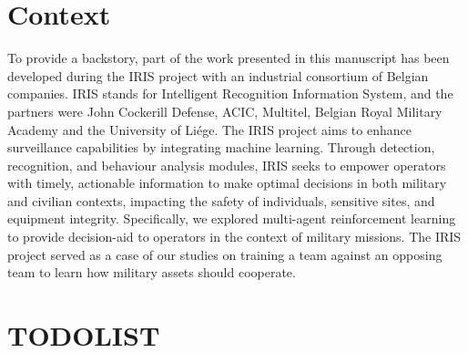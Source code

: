 \section{Context}
\label{sec:ch1_context}
To provide a backstory, part of the work presented in this manuscript has been developed during the IRIS project with an industrial consortium of Belgian companies.
IRIS stands for Intelligent Recognition Information System, and the partners were John Cockerill Defense, ACIC, Multitel, Belgian Royal Military Academy and the University of Li{\'{e}}ge.
The IRIS project aims to enhance surveillance capabilities by integrating machine learning.
Through detection, recognition, and behaviour analysis modules, IRIS seeks to empower operators with timely, actionable information to make optimal decisions in both military and civilian contexts, impacting the safety of individuals, sensitive sites, and equipment integrity.
Specifically, we explored multi-agent reinforcement learning to provide decision-aid to operators in the context of military missions.
The IRIS project served as a case of our studies on training a team against an opposing team to learn how military assets should cooperate.

\newpage
\section{TODOLIST}



